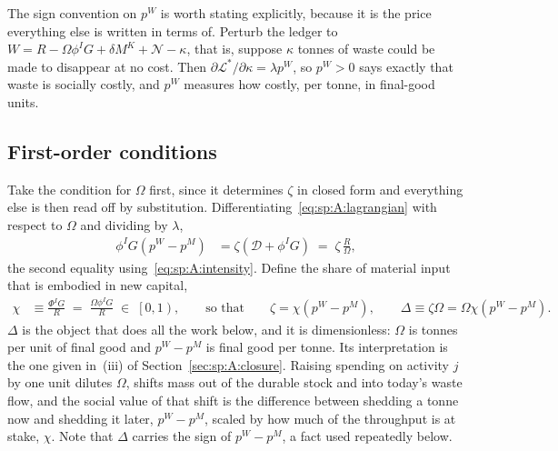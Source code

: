 The sign convention on $p^W$ is worth stating explicitly, because it is the price everything else is
written in terms of. Perturb the ledger to $W=R-\Omega\phi^IG+\delta M^K+\mathcal N-\kappa$, that is,
suppose $\kappa$ tonnes of waste could be made to disappear at no cost. Then
$\partial\mathcal L^*/\partial\kappa=\lambda p^W$, so $p^W>0$ says exactly that waste is socially
costly, and $p^W$ measures how costly, per tonne, in final-good units.


\subsection{First-order conditions}\label{sec:sp:A:foc}

 Take the condition for $\Omega$ first, since it
determines $\zeta$ in closed form and everything else is then read off by substitution.
Differentiating~\eqref{eq:sp:A:lagrangian} with respect to $\Omega$ and dividing by $\lambda$,
\begin{align}
\phi^IG\left(p^W-p^M\right) &= \zeta\left(\mathcal D+\phi^IG\right)
\;=\;\zeta\,\frac{R}{\Omega},
\label{eq:sp:A:foc:Omega}
\end{align}
the second equality using~\eqref{eq:sp:A:intensity}. Define the share of material input that is
embodied in new capital,
\begin{align}
\chi &\equiv \frac{\Phi^IG}{R}\;=\;\frac{\Omega\phi^IG}{R}\;\in\;\left[0,1\right),
\qquad\text{so that}\qquad
\zeta = \chi\left(p^W-p^M\right),
\qquad
\Delta \equiv \zeta\Omega = \Omega\chi\left(p^W-p^M\right).
\label{eq:sp:A:zeta}
\end{align}
$\Delta$ is the object that does all the work below, and it is dimensionless: $\Omega$ is tonnes per
unit of final good and $p^W-p^M$ is final good per tonne. Its interpretation is the one given
in~(iii) of Section~\ref{sec:sp:A:closure}. Raising spending on activity $j$ by one unit dilutes
$\Omega$, shifts mass out of the durable stock and into today's waste flow, and the social value of
that shift is the difference between shedding a tonne now and shedding it later, $p^W-p^M$, scaled by
how much of the throughput is at stake, $\chi$. Note that $\Delta$ carries the sign of $p^W-p^M$, a
fact used repeatedly below.


